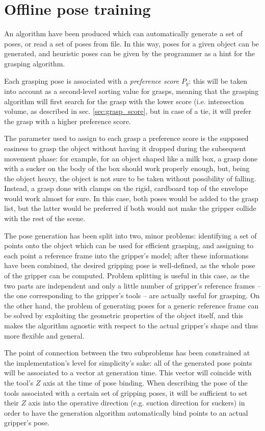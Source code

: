 \section{Offline pose training} \label{sec:pose-generation}
An algorithm have been produced which can automatically generate a set of
poses, or read a set of poses from file. In this way, poses for a given object
can be generated, and heuristic poses can be given by the programmer as a hint
for the grasping algorithm.  

Each grasping pose is associated with a \emph{preference score} $P_{g}$: this will be taken
into account as a second-level sorting value for grasps, meaning that the
grasping algorithm will first search for the grasp with the lower score (i.e.
intersection volume, as described in sec. \ref{sec:grasp_score}, but in case of
a tie, it will prefer the grasp with a higher preference score.

The parameter used to assign to each grasp a preference score is the supposed
easiness to grasp the object without having it dropped during the subsequent
movement phase: for example, for an object shaped like a milk box, a
grasp done with a sucker on the body of the box
should work properly enough, but, being the object heavy, the
object is not sure to be taken without possibility of falling. Instead, a grasp
done with clamps on the rigid, cardboard top of the envelope would work almost
for sure. In this case, both poses would be added to the grasp list, but the
latter would be preferred if both would not make the gripper collide with the
rest of the scene.

The pose generation has been split into two, minor problems: identifying a
set of points onto the object which can be used for efficient grasping, and
assigning to each point a reference frame into the gripper's model; after these
informations have been combined, the desired gripping pose is well-defined, as the
whole pose of the gripper can be computed. Problem splitting is useful in this
case, as the two parts are independent and only a little number of gripper's
reference frames -- the one corresponding to the gripper's tools -- are actually
useful for grasping. On the other hand, the problem of  generating poses for a generic
reference frame can be solved by exploiting the geometric properties of the
object itself, and this makes the algorithm agnostic with respect to the actual
gripper's shape and thus more flexible and general.

The point of connection between the two subproblems has been constrained at the
implementation's level for simplicity's sake: all of the generated pose
points will be associated to a vector at generation time. This vector will
coincide with the tool's $Z$ axis at the time of pose binding. When describing
the pose of the tools associated with a certain set of gripping poses, it will
be sufficient to set their $Z$ axis into the operative direction (e.g. suction
direction for suckers) in order to have the generation algorithm automatically
bind points to an actual gripper's pose.

